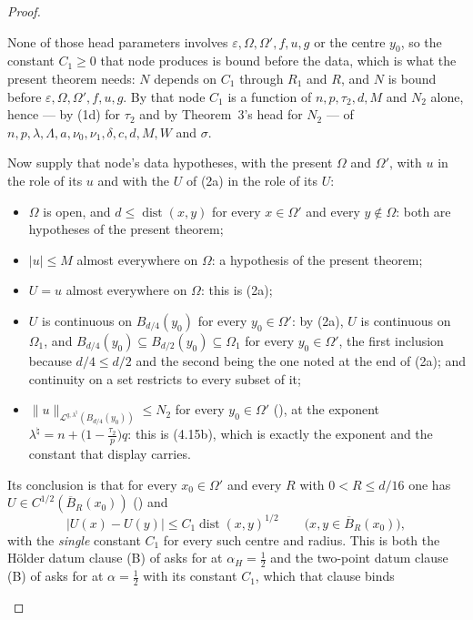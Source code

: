 \begin{proof}
\begin{enumerate}
  None of those head parameters involves $\varepsilon,\Omega,\Omega',f,u,g$ or
  the centre $y_0$, so the constant $C_1\ge0$ that node produces is bound before
  the data, which is what the present theorem needs: $N$ depends on $C_1$
  through $R_1$ and $R$, and $N$ is bound before
  $\varepsilon,\Omega,\Omega',f,u,g$.  By that node $C_1$ is a function of
  $n,p,\tau_2,d,M$ and $N_2$ alone, hence --- by (1d) for $\tau_2$ and by
  Theorem~3's head for $N_2$ --- of
  $n,p,\lambda,\Lambda,a,\nu_0,\nu_1,\delta,c,d,M,W$ and $\sigma$.

  Now supply that node's data hypotheses, with the present $\Omega$ and
  $\Omega'$, with $u$ in the role of its $u$ and with the $U$ of (2a) in the
  role of its $U$:
  \begin{itemize}
  \item $\Omega$ is open, and $d\le\operatorname{dist}(x,y)$ for every
    $x\in\Omega'$ and every $y\notin\Omega$: both are hypotheses of the present
    theorem;
  \item $|u|\le M$ almost everywhere on $\Omega$: a hypothesis of the present
    theorem;
  \item $U=u$ almost everywhere on $\Omega$: this is (2a);
  \item $U$ is continuous on $B_{d/4}(y_0)$ for every $y_0\in\Omega'$: by (2a),
    $U$ is continuous on $\Omega_1$, and
    $B_{d/4}(y_0)\subseteq B_{d/2}(y_0)\subseteq\Omega_1$ for every
    $y_0\in\Omega'$, the first inclusion because $d/4\le d/2$ and the second
    being the one noted at the end of (2a); and continuity on a set restricts
    to every subset of it;
  \item $\|u\|_{\mathcal L^{q,\lambda^\natural}(B_{d/4}(y_0))}\le N_2$ for every
    $y_0\in\Omega'$ (), at the exponent
    $\lambda^\natural=n+\bigl(1-\tfrac{\tau_2}p\bigr)q$: this is
    (4.15b), which is exactly the exponent and the constant that
    display carries.
  \end{itemize}
  Its conclusion is that for every $x_0\in\Omega'$ and every $R$ with
  $0<R\le d/16$ one has $U\in C^{1/2}(\overline B_R(x_0))$
  () and
  \[
  |U(x)-U(y)|\le C_1\operatorname{dist}(x,y)^{1/2}
  \qquad\bigl(x,y\in\overline B_R(x_0)\bigr),
  \]
  with the \emph{single} constant $C_1$ for every such centre and radius.  This
  is both the H\"older datum clause (B) of
   asks for at $\alpha_H=\tfrac12$ and
  the two-point datum clause (B) of 
  asks for at $\alpha=\tfrac12$ with its constant $C_1$, which that clause binds

\end{enumerate}
\end{proof}
